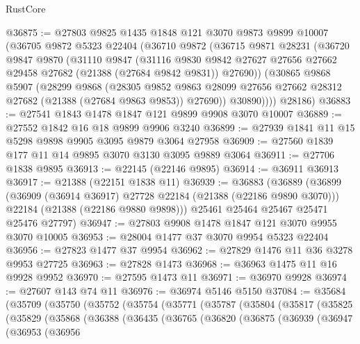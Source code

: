 \begin{lexlean}{RustCore}
\begin{coremodule}
@36875 := @27803
    @9825
    @1435
    @1848
    @121
    @3070
    @9873
    @9899
    @10007
    (@36705
      @9872
      @5323
      @22404
      (@36710
        @9872
        (@36715
          @9871
          @28231
          (@36720
            @9847
            @9870
            (@31110
              @9847
              (@31116
                @9830
                @9842
                @27627
                @27656
                @27662
                @29458
                @27682
                (@21388 (@27684 @9842 @9831))
                @27690))
            (@30865
              @9868
              @5907
              (@28299
                @9868
                (@28305
                  @9852
                  @9863
                  @28099
                  @27656
                  @27662
                  @28312
                  @27682
                  (@21388 (@27684 @9863 @9853))
                  @27690))
              @30890))))
      @28186)
@36883 := @27541 @1843 @1478 @1847 @121 @9899 @9908 @3070 @10007
@36889 := @27552 @1842 @16 @18 @9899 @9906 @3240
@36899 := @27939 @1841 @11 @15 @5298 @9898 @9905 @3095 @9879 @3064 @27958
@36909 := @27560 @1839 @177 @11 @14 @9895 @3070 @3130 @3095 @9889 @3064
@36911 := @27706 @1838 @9895
@36913 := @22145 (@22146 @9895)
@36914 := @36911 @36913
@36917 := @21388 (@22151 @1838 @11)
@36939 := @36883
    (@36889
      (@36899
        (@36909 (@36914 @36917) @27728 @22184 (@21388 (@22186 @9890 @3070)))
        @22184
        (@21388 (@22186 @9880 @9898)))
      @25461
      @25464
      @25467
      @25471
      @25476
      @27797)
@36947 := @27803 @9908 @1478 @1847 @121 @3070 @9955 @3070 @10005
@36953 := @28004 @1477 @37 @3070 @9954 @5323 @22404
@36956 := @27823 @1477 @37 @9954
@36962 := @27829 @1476 @11 @36 @3278 @9953 @27725
@36963 := @27828 @1473
@36968 := @36963 @1475 @11 @16 @9928 @9952
@36970 := @27595 @1473 @11
@36971 := @36970 @9928
@36974 := @27607 @143 @74 @11
@36976 := @36974 @5146 @5150
@37084 := @35684
    (@35709
      (@35750
        (@35752
          (@35754
            (@35771
              (@35787
                (@35804
                  (@35817
                    (@35825
                      (@35829
                        (@35868
                          (@36388
                            (@36435
                              (@36765
                                (@36820
                                  (@36875
                                    (@36939
                                      (@36947
                                        (@36953
                                          (@36956

\end{coremodule}
\end{lexlean}
